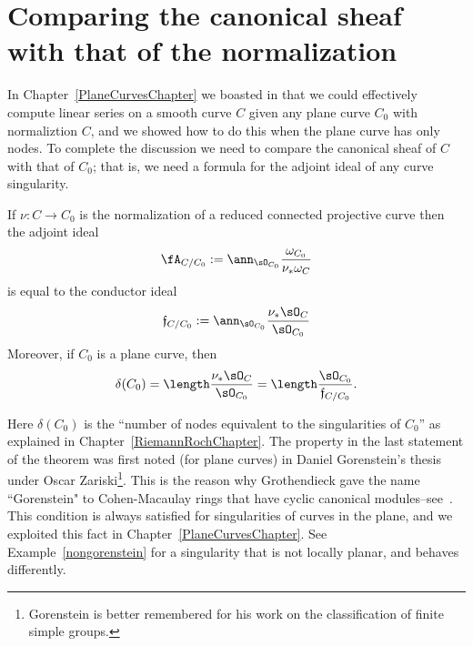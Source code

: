 \section{Comparing the canonical sheaf with that of the normalization}

In Chapter~\ref{PlaneCurvesChapter} we boasted in that we could effectively compute
linear series on a smooth curve $C$ given any plane curve $C_0$ with normaliztion $C$, 
and we showed how to do this when the plane curve has only nodes. To complete the discussion 
we need to compare the canonical sheaf of $C$ with
that of $C_0$; that is, we need a formula for the adjoint ideal of any curve singularity.



\begin{theorem}\label{general adjoint}
If $\nu: C \to C_0$ is the normalization of a reduced connected projective curve then the 
adjoint ideal 
$$
\fA_{C/C_0} :=\ann_{\sO_{C_0}}\frac{\omega_{C_0}}{\nu_* \omega_C}
$$
is equal to the conductor ideal
$$
\mathfrak f_{C/C_0}: = \ann_{\sO_{C_0}}\frac{\nu_* \sO_C}{\sO_{C_0}}	
$$
Moreover, if $C_0$ is a plane curve, then 
$$
\delta(C_0) = \length \frac{\nu_* \sO_C}{\sO_{C_0}} = \length \frac {\sO_{C_0}}{\mathfrak f_{C/C_0}}.
$$
\end{theorem}

Here $\delta(C_0)$ is the ``number of nodes equivalent to the singularities of $C_0$'' as
explained in Chapter~\ref{RiemannRochChapter}.  The property in the last statement of the
theorem  was first noted (for plane curves) in Daniel Gorenstein's thesis under Oscar Zariski\footnote{Gorenstein is better remembered for his work on the classification of finite simple groups.}. This is the
reason why Grothendieck gave the name ``Gorenstein" to Cohen-Macaulay rings that have cyclic canonical 
modules--see~\cite{Bass}. 
This condition is always satisfied for singularities of curves in the plane, and we exploited this fact in Chapter~\ref{PlaneCurvesChapter}.
See Example~\ref{nongorenstein} for a singularity that is not locally planar, and behaves differently.


